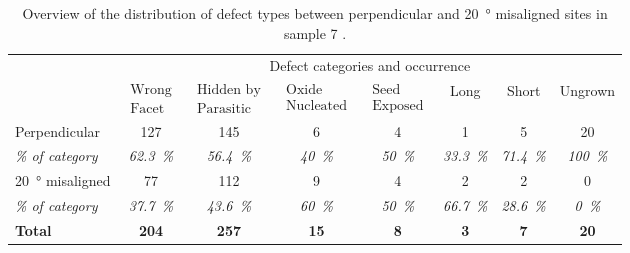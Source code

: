 \begin{table}
    \centering
    \caption[Overview of the distribution of defect types in sample 7.]{Overview of the distribution of defect types between perpendicular and \qty{20}{\degree} misaligned sites in sample 7 \cite{Brugnolotto2023_2}.}
    \begin{tabular}{l|ccccccc}
        \hline
         & \multicolumn{7}{c}{Defect categories and occurrence} \\ 
         & $\begin{matrix} \text{Wrong} \\ \text{Facet} \end{matrix}$ & $\begin{matrix} \text{Hidden by} \\ \text{Parasitic} \end{matrix}$ & $\begin{matrix} \text{Oxide} \\ \text{Nucleated} \end{matrix}$ & $\begin{matrix} \text{Seed} \\ \text{Exposed} \end{matrix}$ & Long & Short & Ungrown \\ 
        \hline \hline
        Perpendicular & \num{127} & \num{145} & \num{6} & \num{4} & \num{1} & \num{5} & \num{20} \\ 
        \textit{\% of category} & \textit{\qty{62.3}{\%}} & \textit{\qty{56.4}{\%}} & \textit{\qty{40}{\%}} & \textit{\qty{50}{\%}} & \textit{\qty{33.3}{\%}} & \textit{\qty{71.4}{\%}} & \textit{\qty{100}{\%}} \\ 
        \hline
        \qty{20}{\degree} misaligned & \num{77} & \num{112} & \num{9} & \num{4} & \num{2} & \num{2} & \num{0} \\ 
        \textit{\% of category} & \textit{\qty{37.7}{\%}} & \textit{\qty{43.6}{\%}} & \textit{\qty{60}{\%}} & \textit{\qty{50}{\%}} & \textit{\qty{66.7}{\%}} & \textit{\qty{28.6}{\%}} & \textit{\qty{0}{\%}} \\ 
        \hline
        \textbf{Total} & \textbf{\num{204}} & \textbf{\num{257}} & \textbf{\num{15}} & \textbf{\num{8}} & \textbf{\num{3}} & \textbf{\num{7}} & \textbf{\num{20}} \\
        \hline
    \end{tabular}
    \label{tab:defects_s7}
\end{table}






